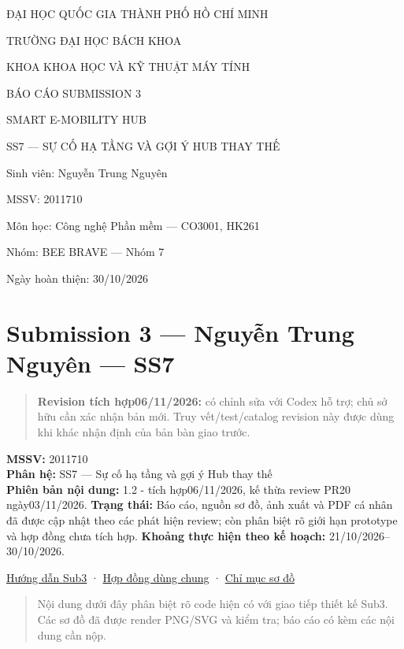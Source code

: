 \documentclass[11pt,a4paper]{article}
\begin{document}
\setcounter{page}{1}
\tableofcontents
\newpage

ĐẠI HỌC QUỐC GIA THÀNH PHỐ HỒ CHÍ MINH

TRƯỜNG ĐẠI HỌC BÁCH KHOA

KHOA KHOA HỌC VÀ KỸ THUẬT MÁY TÍNH

BÁO CÁO SUBMISSION 3

SMART E-MOBILITY HUB

SS7 --- SỰ CỐ HẠ TẦNG VÀ GỢI Ý HUB THAY THẾ

Sinh viên: Nguyễn Trung Nguyên

MSSV: 2011710

Môn học: Công nghệ Phần mềm --- CO3001, HK261

Nhóm: BEE BRAVE --- Nhóm 7

Ngày hoàn thiện: 30/10/2026

\hypertarget{submission-3-nguyux1ec5n-trung-nguyuxean-ss7}{%
\section{Submission 3 --- Nguyễn Trung Nguyên ---
SS7}\label{submission-3-nguyux1ec5n-trung-nguyuxean-ss7}}

\begin{quote}
\textbf{Revision tích hợp06/11/2026:} có chỉnh sửa với Codex hỗ trợ; chủ
sở hữu cần xác nhận bản mới. Truy vết/test/catalog revision này được
dùng khi khác nhận định của bản bàn giao trước.
\end{quote}

\textbf{MSSV:} 2011710\\
\textbf{Phân hệ:} SS7 --- Sự cố hạ tầng và gợi ý Hub thay thế\\
\textbf{Phiên bản nội dung:} 1.2 - tích hợp06/11/2026, kế thừa review
PR20 ngày03/11/2026. \textbf{Trạng thái:} Báo cáo, nguồn sơ đồ, ảnh xuất
và PDF cá nhân đã được cập nhật theo các phát hiện review; còn phân biệt
rõ giới hạn prototype và hợp đồng chưa tích hợp. \textbf{Khoảng thực
hiện theo kế hoạch:} 21/10/2026--30/10/2026.

\href{../../../../GUIDANCE_FOR_SUB_3.md}{Hướng dẫn Sub3} ·
\href{../shared/shared_contracts.md}{Hợp đồng dùng chung} ·
\href{../../../diagrams/submission_3/README.md}{Chỉ mục sơ đồ}

\begin{quote}
Nội dung dưới đây phân biệt rõ code hiện có với giao tiếp thiết kế Sub3.
Các sơ đồ đã được render PNG/SVG và kiểm tra; báo cáo có kèm các nội
dung cần nộp.
\end{quote}
\end{document}
